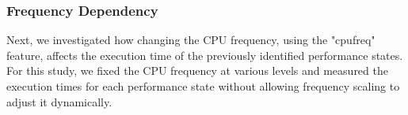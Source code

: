 

\subsubsection{Frequency Dependency } \label{sec:frequencyDependency}
Next, we investigated how changing the CPU frequency, using the "cpufreq" feature, affects the execution time of the previously identified performance states. For this study, we fixed the CPU frequency at various levels and measured the execution times for each performance state without allowing frequency scaling to adjust it dynamically.  
%

